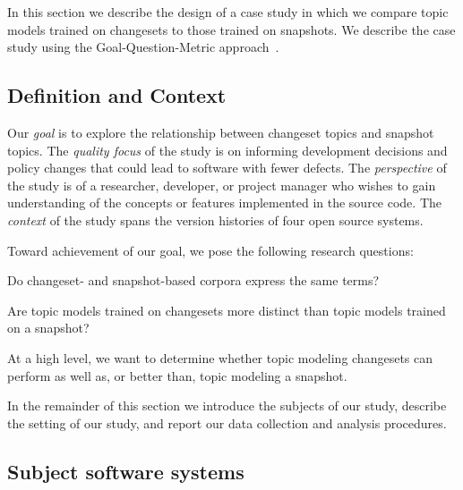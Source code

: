 
In this section we describe the design of a case study in which we
compare topic models trained on changesets to those trained on snapshots.
We describe the case study using the Goal-Question-Metric approach~\cite{Basili-etal:94}.

\subsection{Definition and Context}

Our \textit{goal} is to explore the relationship between changeset topics and snapshot topics.
The \textit{quality focus} of the study is on informing development decisions and policy changes
that could lead to software with fewer defects.
The \textit{perspective} of the study is of a researcher, developer, or project manager who wishes
to gain understanding of the concepts or features implemented in the source code.
The \textit{context} of the study spans the version histories of four open source systems.

Toward achievement of our goal, we pose the following research questions:
\begin{description}[font=\itshape\mdseries,leftmargin=10mm,style=sameline]
    \item[RQ1] Do changeset- and snapshot-based corpora express the same terms?
    \item[RQ2] Are topic models trained on changesets more distinct than topic models trained on a snapshot?
\end{description}
At a high level, we want to determine whether topic modeling changesets can perform as well as, or better than, topic modeling a snapshot.

In the remainder of this section we introduce the subjects of our study,
describe the setting of our study, and report our data collection and analysis procedures.


\subsection{Subject software systems}

